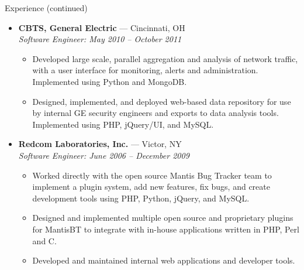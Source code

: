 \documentclass[11pt,oneside]{article}
\newenvironment{ressection}[1]{
    \vspace{8pt}
    {\fontfamily{phv}\selectfont\Large#1}
    \begin{itemize}
    \vspace{3pt}
}{
    \end{itemize}
}
\newcommand{\ressubitem}[1]{
    \vspace{-1pt}
    \item \begin{flushleft} #1 \end{flushleft}
}
\newcommand{\resbigitem}[3]{
    \vspace{-5pt}
    \item
    \textbf{#1} --- #2 \\
    \textit{#3}
}
\newenvironment{ressubsec}[3]{
    \resbigitem{#1}{#2}{#3}
    \vspace{-2pt}
    \begin{itemize}
}{
    \end{itemize}
}
\begin{document}
\newpage

\begin{ressection}{Experience (continued)}

    \begin{ressubsec}{CBTS, General Electric}{Cincinnati, OH}
    {Software Engineer: May 2010 -- October 2011}
        \ressubitem{Developed large scale, parallel aggregation and analysis of network
        traffic, with a user interface for monitoring, alerts and administration.
        Implemented using Python and MongoDB.}
        \ressubitem{Designed, implemented, and deployed web-based data repository
        for use by internal GE security engineers and exports to data analysis tools.
        Implemented using PHP, jQuery/UI, and MySQL.}
    \end{ressubsec}


    \begin{ressubsec}{Redcom Laboratories, Inc.}{Victor, NY}
    {Software Engineer: June 2006 -- December 2009}
        \ressubitem{Worked directly with the open source Mantis Bug Tracker team to implement
        a plugin system, add new features, fix bugs, and create development tools using PHP, Python,
        jQuery, and MySQL.}
        \ressubitem{Designed and implemented multiple open source and proprietary plugins for MantisBT
        to integrate with in-house applications written in PHP, Perl and C.}
        \ressubitem{Developed and maintained internal web applications and developer tools.}
    \end{ressubsec}


\end{ressection}
\end{document}
